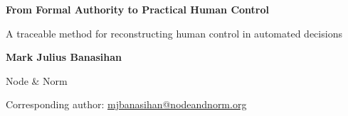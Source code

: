 \documentclass[11pt]{article}
\begin{document}
\thispagestyle{plain}
\begin{center}
{\LARGE\bfseries\color{TAENavy} From Formal Authority to Practical Human Control\par}
\vspace{0.45em}

{\large A traceable method for reconstructing human control in automated decisions\par}
\vspace{0.45em}

{\large\bfseries Mark Julius Banasihan\par}
\vspace{-0.25em}
{\normalsize Node \& Norm\par}
\vspace{-0.25em}
{\normalsize Corresponding author: \href{mailto:mjbanasihan@nodeandnorm.org}{mjbanasihan@nodeandnorm.org}\par}
\end{center}

\end{document}
